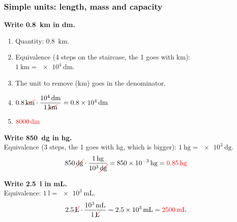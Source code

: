 
\subsubsection{Simple units: length, mass and capacity}

\begin{example}
    \textbf{Write \qty{0.8}{\km} in \unit{\dm}.}
    \begin{enumerate}[label=\numberballmDarkTeal]
        \item Quantity: \qty{0.8}{\km}.
        \item Equivalence (4 steps on the staircase, the 1 goes with \unit{\km}): \(\qty{1}{\km} = \qty{e4}{\dm}\).
        \item The unit to remove (\unit{\km}) goes in the denominator.
        \item \(
            \num{0.8}\,\cancelunit{\km} \cdot \dfrac{\qty{e4}{\dm}}{1\,\cancelunit{\km}} = \qty{0.8e4}{\dm}
        \)
        \item \(\textcolor{red}{\qty{8000}{\dm}}\)
    \end{enumerate}
\end{example}

\begin{example}
    \textbf{Write \qty{850}{\deci\gram} in \unit{\hecto\gram}.} \\
    Equivalence (3 steps, the 1 goes with \unit{\hecto\gram}, which is bigger): \(\qty{1}{\hecto\gram} = \qty{e3}{\deci\gram}\).
    \begin{equation*}
        \num{850}\,\cancelunit{\deci\gram} \cdot \dfrac{\qty{1}{\hecto\gram}}{\num{e3}\,\cancelunit{\deci\gram}} = \qty{850e-3}{\hecto\gram} = \textcolor{red}{\qty{0.85}{\hecto\gram}}
    \end{equation*}
\end{example}

\begin{example}
    \textbf{Write \qty{2.5}{\litre} in \unit{\mL}.} \\
    Equivalence: \(\qty{1}{\litre} = \qty{e3}{\mL}\).
    \begin{equation*}
        \num{2.5}\,\cancelunit{\litre} \cdot \dfrac{\qty{e3}{\mL}}{1\,\cancelunit{\litre}} = \qty{2.5e3}{\mL} = \textcolor{red}{\qty{2500}{\mL}}
    \end{equation*}
\end{example}

